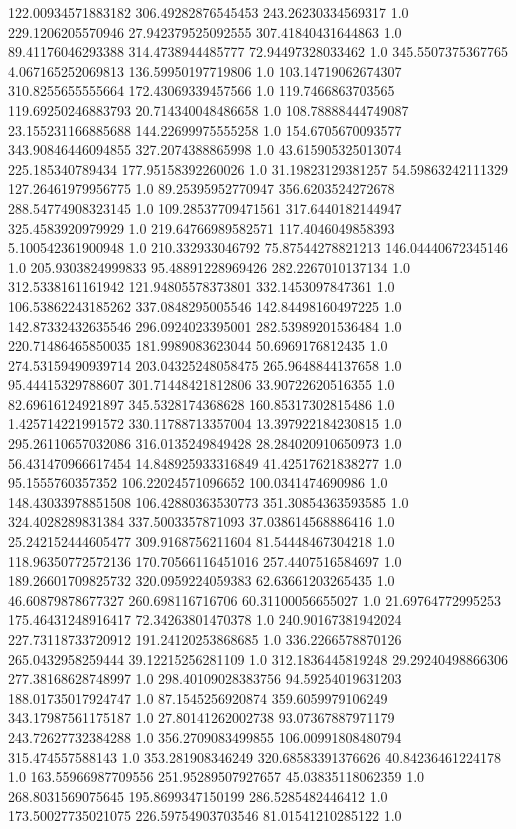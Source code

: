 122.00934571883182	306.49282876545453	243.26230334569317	1.0
229.1206205570946	27.942379525092555	307.41840431644863	1.0
89.41176046293388	314.4738944485777	72.94497328033462	1.0
345.5507375367765	4.067165252069813	136.59950197719806	1.0
103.14719062674307	310.8255655555664	172.43069339457566	1.0
119.7466863703565	119.69250246883793	20.714340048486658	1.0
108.78888444749087	23.155231166885688	144.22699975555258	1.0
154.6705670093577	343.90846446094855	327.2074388865998	1.0
43.615905325013074	225.185340789434	177.95158392260026	1.0
31.19823129381257	54.59863242111329	127.26461979956775	1.0
89.25395952770947	356.6203524272678	288.54774908323145	1.0
109.28537709471561	317.6440182144947	325.4583920979929	1.0
219.64766989582571	117.4046049858393	5.100542361900948	1.0
210.332933046792	75.87544278821213	146.04440672345146	1.0
205.9303824999833	95.48891228969426	282.2267010137134	1.0
312.5338161161942	121.94805578373801	332.1453097847361	1.0
106.53862243185262	337.0848295005546	142.84498160497225	1.0
142.87332432635546	296.0924023395001	282.53989201536484	1.0
220.71486465850035	181.9989083623044	50.6969176812435	1.0
274.53159490939714	203.04325248058475	265.9648844137658	1.0
95.44415329788607	301.71448421812806	33.90722620516355	1.0
82.69616124921897	345.5328174368628	160.85317302815486	1.0
1.425714221991572	330.11788713357004	13.397922184230815	1.0
295.26110657032086	316.0135249849428	28.284020910650973	1.0
56.431470966617454	14.848925933316849	41.42517621838277	1.0
95.1555760357352	106.22024571096652	100.0341474690986	1.0
148.43033978851508	106.42880363530773	351.30854363593585	1.0
324.4028289831384	337.5003357871093	37.038614568886416	1.0
25.242152444605477	309.9168756211604	81.54448467304218	1.0
118.96350772572136	170.70566116451016	257.4407516584697	1.0
189.26601709825732	320.0959224059383	62.63661203265435	1.0
46.60879878677327	260.698116716706	60.31100056655027	1.0
21.69764772995253	175.46431248916417	72.34263801470378	1.0
240.90167381942024	227.73118733720912	191.24120253868685	1.0
336.2266578870126	265.0432958259444	39.12215256281109	1.0
312.1836445819248	29.29240498866306	277.38168628748997	1.0
298.40109028383756	94.59254019631203	188.01735017924747	1.0
87.1545256920874	359.6059979106249	343.17987561175187	1.0
27.80141262002738	93.07367887971179	243.72627732384288	1.0
356.2709083499855	106.00991808480794	315.474557588143	1.0
353.281908346249	320.68583391376626	40.84236461224178	1.0
163.55966987709556	251.95289507927657	45.03835118062359	1.0
268.8031569075645	195.8699347150199	286.5285482446412	1.0
173.50027735021075	226.59754903703546	81.01541210285122	1.0
